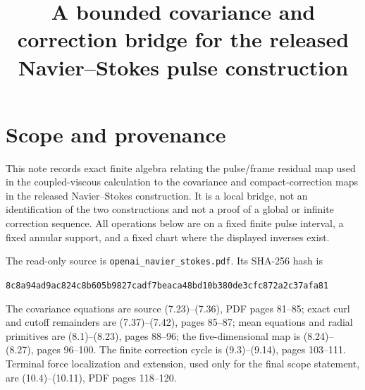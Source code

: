 \documentclass[11pt]{article}
\title{A bounded covariance and correction bridge for the released Navier--Stokes pulse construction}
\author{}
\date{}
\begin{document}
\maketitle
\sloppy

\section{Scope and provenance}
This note records exact finite algebra relating the pulse/frame residual map used in the
coupled-viscous calculation to the covariance and compact-correction maps in the released
Navier--Stokes construction.  It is a local bridge, not an identification of the two
constructions and not a proof of a global or infinite correction sequence.  All operations
below are on a fixed finite pulse interval, a fixed annular support, and a fixed chart where
the displayed inverses exist.

The read-only source is \texttt{openai\_navier\_stokes.pdf}.  Its SHA-256 hash is
\begin{center}
\texttt{8c8a94ad9ac824c8b605b9827cadf7beaca48bd10b380de3cfc872a2c37afa81}
\end{center}
The covariance equations are source (7.23)--(7.36), PDF pages 81--85; exact curl and
cutoff remainders are (7.37)--(7.42), pages 85--87; mean equations and radial primitives
are (8.1)--(8.23), pages 88--96; the five-dimensional map is (8.24)--(8.27), pages
96--100.  The finite correction cycle is (9.3)--(9.14), pages 103--111.  Terminal force
localization and extension, used only for the final scope statement, are (10.4)--(10.11),
PDF pages 118--120.
\end{document}
